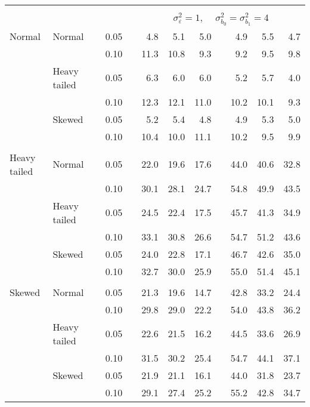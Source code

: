 \begin{table}[ht]
\begin{scriptsize}
\begin{center}
\begin{tabular}{ll p{.1cm} c p{.1cm} rrr p{.1cm} rrr}
&&&&&&&&&&&\\
& && && \multicolumn{7}{c}{$\sigma_{\varepsilon}^2 = 1$, \ \ $\sigma_{b_0}^2 = \sigma_{b_1}^2 = 4$} \\ \cline{6-12}
\rowcolor{gray!20}Normal       & Normal       && 0.05 &&   4.8 & 5.1 & 5.0 &   & 4.9 & 5.5 & 4.7 \\ 
\rowcolor{gray!20}             &              && 0.10 &&   11.3 & 10.8 & 9.3 &   & 9.2 & 9.5 & 9.8 \\ 
\rowcolor{gray!20}             & Heavy tailed && 0.05 &&   6.3 & 6.0 & 6.0 &   & 5.2 & 5.7 & 4.0 \\ 
\rowcolor{gray!20}             &              && 0.10 &&   12.3 & 12.1 & 11.0 &   & 10.2 & 10.1 & 9.3 \\ 
\rowcolor{gray!20}             & Skewed       && 0.05 &&   5.2 & 5.4 & 4.8 &   & 4.9 & 5.3 & 5.0 \\ 
\rowcolor{gray!20}             &              && 0.10 &&   10.4 & 10.0 & 11.1 &   & 10.2 & 9.5 & 9.9 \\ 
&&&&&&&&&&&\\
Heavy tailed & Normal       && 0.05 &&   22.0 & 19.6 & 17.6 &   & 44.0 & 40.6 & 32.8 \\ 
             &              && 0.10 &&   30.1 & 28.1 & 24.7 &   & 54.8 & 49.9 & 43.5 \\ 
             & Heavy tailed && 0.05 &&   24.5 & 22.4 & 17.5 &   & 45.7 & 41.3 & 34.9 \\ 
             &              && 0.10 &&   33.1 & 30.8 & 26.6 &   & 54.7 & 51.2 & 43.6 \\ 
             & Skewed       && 0.05 &&   24.0 & 22.8 & 17.1 &   & 46.7 & 42.6 & 35.0 \\ 
             &              && 0.10 &&   32.7 & 30.0 & 25.9 &   & 55.0 & 51.4 & 45.1 \\ 
&&&&&&&&&&&\\
Skewed       & Normal       && 0.05 &&   21.3 & 19.6 & 14.7 &   & 42.8 & 33.2 & 24.4 \\ 
             &              && 0.10 &&   29.8 & 29.0 & 22.2 &   & 54.0 & 43.8 & 36.2 \\ 
             & Heavy tailed && 0.05 &&   22.6 & 21.5 & 16.2 &   & 44.5 & 33.6 & 26.9 \\ 
             &              && 0.10 &&   31.5 & 30.2 & 25.4 &   & 54.7 & 44.1 & 37.1 \\ 
             & Skewed       && 0.05 &&   21.9 & 21.1 & 16.1 &   & 44.0 & 31.8 & 23.7 \\ 
             &              && 0.10 &&   29.1 & 27.4 & 25.2 &   & 55.2 & 42.8 & 34.7 \\ 


\hline
\end{tabular}
\end{center}
\end{scriptsize}
\end{table}

